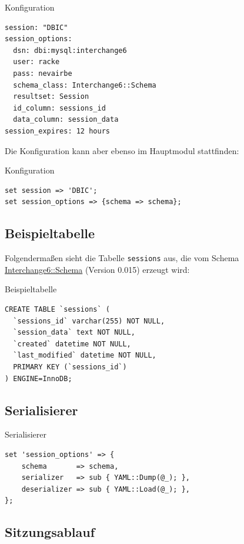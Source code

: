 \begin{frame}[fragile]{Konfiguration}
\begin{lstlisting}
session: "DBIC"
session_options:
  dsn: dbi:mysql:interchange6
  user: racke
  pass: nevairbe
  schema_class: Interchange6::Schema
  resultset: Session
  id_column: sessions_id
  data_column: session_data
session_expires: 12 hours
\end{lstlisting}
\end{frame}

Die Konfiguration kann aber ebenso im Hauptmodul
stattfinden:

\begin{frame}[fragile]{Konfiguration}
\begin{lstlisting}
set session => 'DBIC';
set session_options => {schema => schema};
\end{lstlisting}
\end{frame}

\subsection{Beispieltabelle}

Folgendermaßen sieht die Tabelle \verb|sessions| aus,
die vom Schema \href{https://metacpan.org/pod/Interchange6::Schema}{Interchange6::Schema} (Version 0.015)
erzeugt wird:

\begin{frame}[fragile]{Beispieltabelle}
\begin{lstlisting}
CREATE TABLE `sessions` (
  `sessions_id` varchar(255) NOT NULL,
  `session_data` text NOT NULL,
  `created` datetime NOT NULL,
  `last_modified` datetime NOT NULL,
  PRIMARY KEY (`sessions_id`)
) ENGINE=InnoDB;
\end{lstlisting}
\end{frame}

\subsection{Serialisierer}
\begin{frame}[fragile]{Serialisierer}
\begin{lstlisting}
set 'session_options' => {
    schema       => schema,
    serializer   => sub { YAML::Dump(@_); },
    deserializer => sub { YAML::Load(@_); },
};
\end{lstlisting}
\end{frame}

\subsection{Sitzungsablauf}


